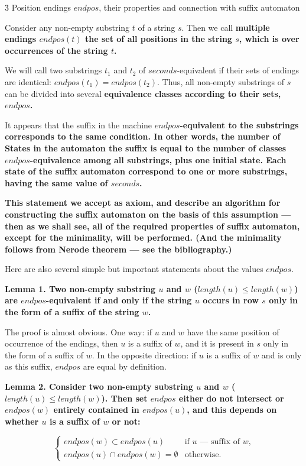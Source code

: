 \h3{ Position endings $endpos$, their properties and connection with suffix automaton }

Consider any non-empty substring $t$ of a string $s$. Then we call \bf{multiple endings} $endpos(t)$ the set of all positions in the string $s$, which is over occurrences of the string $t$.

We will call two substrings $t_1$ and $t_2$ of $seconds$-equivalent if their sets of endings are identical: $endpos(t_1) = endpos(t_2)$. Thus, all non-empty substrings of $s$ can be divided into several \bf{equivalence classes} according to their sets, $endpos$.

It appears that the suffix in the machine \bf{$endpos$-equivalent to the substrings corresponds to the same condition}. In other words, the number of States in the automaton the suffix is equal to the number of classes $endpos$-equivalence among all substrings, plus one initial state. Each state of the suffix automaton correspond to one or more substrings, having the same value of $seconds$.

\bf{This statement we accept as axiom}, and describe an algorithm for constructing the suffix automaton on the basis of this assumption --- then as we shall see, all of the required properties of suffix automaton, except for the minimality, will be performed. (And the minimality follows from Nerode theorem --- see the bibliography.)

Here are also several simple but important statements about the values $endpos$.

\bf{Lemma 1}. Two non-empty substring $u$ and $w$ ($length(u) \le length(w)$) are $endpos$-equivalent if and only if the string $u$ occurs in row $s$ only in the form of a suffix of the string $w$.

The proof is almost obvious. One way: if $u$ and $w$ have the same position of occurrence of the endings, then $u$ is a suffix of $w$, and it is present in $s$ only in the form of a suffix of $w$. In the opposite direction: if $u$ is a suffix of $w$ and is only as this suffix, $endpos$ are equal by definition.

\bf{Lemma 2}. Consider two non-empty substring $u$ and $w$ ($length(u) \le length(w)$). Then set $endpos$ either do not intersect or $endpos(w)$ entirely contained in $endpos(u)$, and this depends on whether $u$ is a suffix of $w$ or not:

$$ \begin{cases}
endpos(w) \subset endpos(u) & \text{if $u$ --- suffix of $w$,}
\\
endpos(u) \cap endpos(w) = \emptyset & \text{otherwise.}
\end{cases} $$

